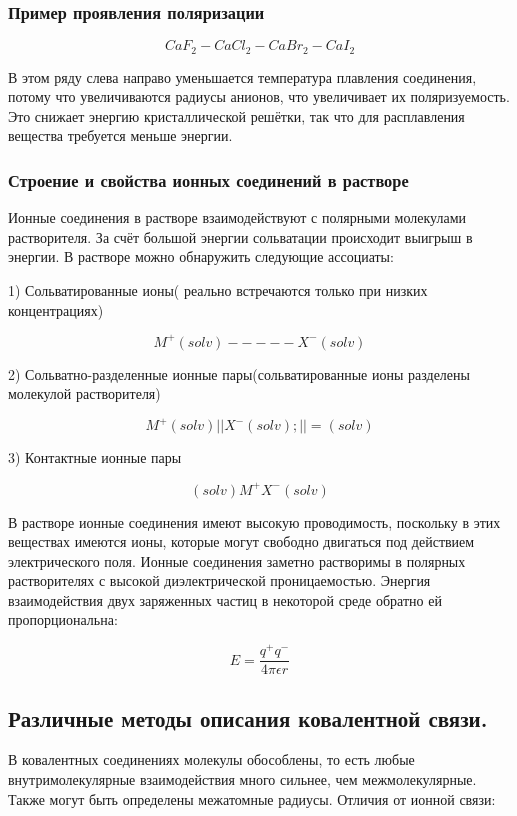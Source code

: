 \documentclass[14pt,a4paper]{scrartcl}
\begin{document}
\subsubsection{\textbf{Пример проявления поляризации}}

$$CaF_2 - CaCl_2 - CaBr_2 - CaI_2$$

В этом ряду слева направо уменьшается температура
плавления соединения, потому что увеличиваются
радиусы анионов, что увеличивает их
поляризуемость. Это снижает энергию
кристаллической решётки, так что для расплавления
вещества требуется меньше энергии.

\subsubsection{\textbf{Строение и свойства ионных соединений в растворе}}

Ионные соединения в растворе взаимодействуют с полярными
молекулами растворителя. За счёт большой энергии сольватации
происходит выигрыш в энергии. В растворе можно обнаружить
следующие ассоциаты:


1) Сольватированные ионы( реально встречаются только при низких концентрациях)

$$M^+(solv) - - - - -X^-(solv)$$

2) Сольватно-разделенные ионные пары(сольватированные ионы разделены молекулой растворителя)

$$M^+(solv) || X^-(solv); ||=(solv)$$

3) Контактные ионные пары

$$(solv)M^+X^-(solv)$$

В растворе ионные соединения имеют высокую проводимость,
поскольку в этих веществах имеются ионы, которые могут
свободно двигаться под действием электрического поля. Ионные
соединения заметно растворимы в полярных растворителях с
высокой диэлектрической проницаемостью. Энергия
взаимодействия двух заряженных частиц в некоторой среде обратно
ей пропорциональна:


$$E = \frac{q^+q^-}{4\pi\epsilon r}$$

\subsection{\textbf{Различные методы описания ковалентной связи.}}

В ковалентных соединениях молекулы обособлены, то есть любые
внутримолекулярные взаимодействия много сильнее, чем
межмолекулярные. Также могут быть определены межатомные
радиусы. Отличия от ионной связи:
 
\end{document}
